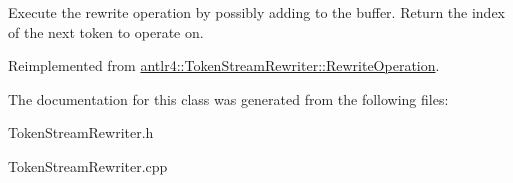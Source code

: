Execute the rewrite operation by possibly adding to the buffer. Return the index of the next token to operate on. 

Reimplemented from \hyperlink{classantlr4_1_1TokenStreamRewriter_1_1RewriteOperation_a9e9998fb2aa14bbf60710dde1d6d50b0}{antlr4\+::\+Token\+Stream\+Rewriter\+::\+Rewrite\+Operation}.



The documentation for this class was generated from the following files\+:\begin{DoxyCompactItemize}
\item 
Token\+Stream\+Rewriter.\+h\item 
Token\+Stream\+Rewriter.\+cpp\end{DoxyCompactItemize}
